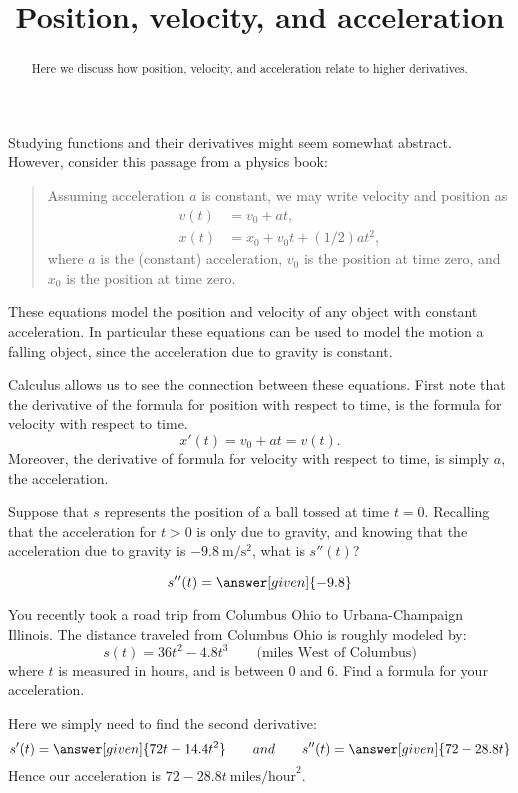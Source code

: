 \documentclass{ximera}
\title[Dig-In:]{Position, velocity, and acceleration}
\begin{document}
\begin{abstract}
  Here we discuss how position, velocity, and acceleration relate to
  higher derivatives.
\end{abstract}
\maketitle

Studying functions and their derivatives might seem somewhat
abstract. However, consider this passage from a physics book:
\begin{quote}
  Assuming acceleration $a$ is constant, we may write velocity and
  position as
  \begin{align*}
    v(t) &= v_0 + at,\\
    x(t) &= x_0 + v_0 t + (1/2) a t^2,
  \end{align*}
  where $a$ is the (constant) acceleration, $v_0$ is the position at
  time zero, and $x_0$ is the position at time zero.
\end{quote}
These equations model the position and velocity of any object with
constant acceleration. In particular these equations can be used to
model the motion a falling object, since the acceleration due to
gravity is constant.

Calculus allows us to see the connection between these
equations. First note that the derivative of the formula for position with respect to time, is the formula for velocity with respect to
time.
\[
x'(t) = v_0 + at = v(t).
\]
Moreover, the derivative of formula for velocity with respect to time,
is simply $a$, the acceleration.

\begin{question}
  Suppose that $s$ represents the position of a ball tossed at time
  $t=0$. Recalling that the acceleration for $t>0$ is only due to
  gravity, and knowing that the acceleration due to gravity is
  $-9.8~\mathrm{m}/\mathrm{s}^2$, what is $s''(t)$?
  \begin{prompt}
    \[
  s''(t) = \answer[given]{-9.8}
  \]
  \end{prompt}
\end{question}



\begin{example}
You recently took a road trip from Columbus Ohio to Urbana-Champaign
Illinois. The distance traveled from Columbus Ohio is roughly modeled
by:
\[
s(t) = 36t^2 -4.8t^3 \qquad\text{(miles West of Columbus)}
\]
where $t$ is measured in hours, and is between $0$ and $6$. Find a
formula for your acceleration.
  \begin{explanation}
    Here we simply need to find the second derivative:
    \[
    s'(t) = \answer[given]{72 t- 14.4 t^2} \qquad{and}\qquad s''(t) = \answer[given]{72 - 28.8t}
    \]
    Hence our acceleration is $72-28.8t~\text{miles/hour}^2$.
  \end{explanation}
\end{example}
\end{document}
